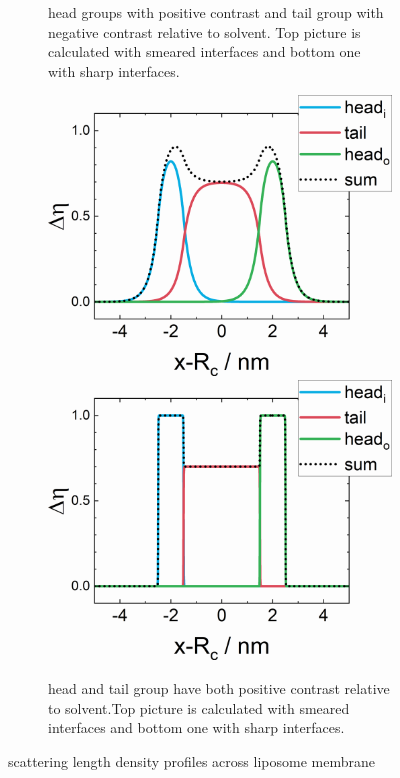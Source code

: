 \begin{figure}[htb]
\begin{subfigure}[b]{.48\textwidth}
   \caption{head groups with positive contrast and tail group with negative contrast relative to solvent. Top picture is calculated with smeared interfaces and bottom one with sharp interfaces.}
   \label{fig:vesicle_profile12}
\end{subfigure}
\hfill
\begin{subfigure}[b]{.48\textwidth}
   \centering
    \includegraphics[width=\textwidth]{../images/form_factor/vesicles/vesicle_profile3.png}
    \includegraphics[width=\textwidth]{../images/form_factor/vesicles/vesicle_profile4.png}
   \caption{head and tail group have both positive contrast relative to solvent.Top picture is calculated with smeared interfaces and bottom one with sharp interfaces.}
   \label{fig:vesicle_profile34}
\end{subfigure}
\caption{scattering length density profiles across liposome membrane} \label{fig:vesicle_profiles}
\end{figure}
